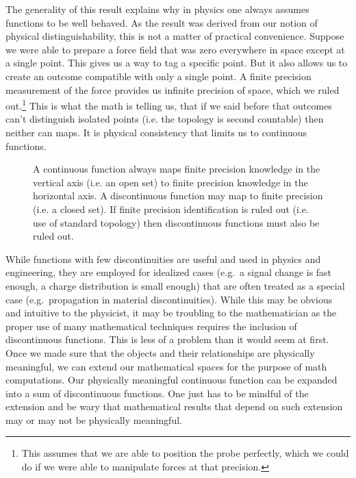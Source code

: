 \documentclass[aps,pra,10pt,twocolumn,floatfix,nofootinbib]{revtex4-1}
\numberwithin{equation}{section}
\theoremstyle{definition}
\begin{document}
The generality of this result explains why in physics one always assumes functions to be well behaved. As the result was derived from our notion of physical distinguishability, this is not a matter of practical convenience. Suppose we were able to prepare a force field that was zero everywhere in space except at a single point. This gives us a way to tag a specific point. But it also allows us to create an outcome compatible with only a single point. A finite precision measurement of the force provides us infinite precision of space, which we ruled out.\footnote{This assumes that we are able to position the probe perfectly, which we could do if we were able to manipulate forces at that precision.} This is what the math is telling us, that if we said before that outcomes can't distinguish isolated points (i.e. the topology is second countable) then neither can maps. It is physical consistency that limits us to continuous functions.

\begin{figure}
	
	\caption{A continuous function always maps finite precision knowledge in the vertical axis (i.e. an open set) to finite precision knowledge in the horizontal axis. A discontinuous function may map to finite precision (i.e. a closed set). If finite precision identification is ruled out (i.e. use of standard topology) then discontinuous functions must also be ruled out.}
	\label{fig:continuous_map}
\end{figure}

While functions with few discontinuities are useful and used in physics and engineering, they are employed for idealized cases  (e.g.~a signal change is fast enough, a charge distribution is small enough) that are often treated as a special case (e.g.~propagation in material discontinuities). While this may be obvious and intuitive to the physicist, it may be troubling to the mathematician as the proper use of many mathematical techniques requires the inclusion of discontinuous functions. This is less of a problem than it would seem at first. Once we made sure that the objects and their relationships are physically meaningful, we can extend our mathematical spaces for the purpose of math computations. Our physically meaningful continuous function can be expanded into a sum of discontinuous functions. One just has to be mindful of the extension and be wary that mathematical results that depend on such extension may or may not be physically meaningful.
\end{document}
